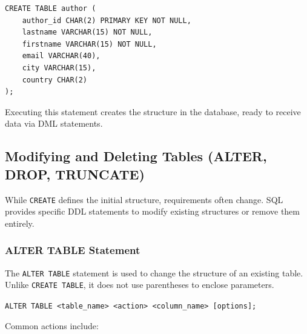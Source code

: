 \documentclass{article}
\begin{document}
\begin{verbatim}
CREATE TABLE author (
    author_id CHAR(2) PRIMARY KEY NOT NULL,
    lastname VARCHAR(15) NOT NULL,
    firstname VARCHAR(15) NOT NULL,
    email VARCHAR(40),
    city VARCHAR(15),
    country CHAR(2)
);
\end{verbatim}
Executing this statement creates the structure in the database, ready to receive data via DML statements.


\subsection{Modifying and Deleting Tables (ALTER, DROP, TRUNCATE)}

While \texttt{CREATE} defines the initial structure, requirements often change. SQL provides specific DDL statements to modify existing structures or remove them entirely.

\subsubsection{ALTER TABLE Statement}
The \texttt{ALTER TABLE} statement is used to change the structure of an existing table. Unlike \texttt{CREATE TABLE}, it does not use parentheses to enclose parameters.

\begin{FormulaBox}
\texttt{ALTER TABLE <table\_name> <action> <column\_name> [options];}
\end{FormulaBox}

Common actions include:
\end{document}
